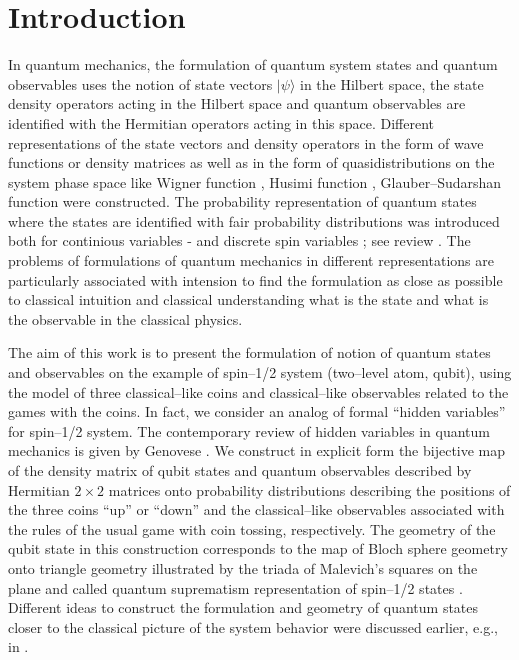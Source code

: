 \documentclass[12pt]{article}
\begin{document}
\section{Introduction}
In quantum mechanics, the formulation of quantum system states and quantum observables \cite{Dirac,Schrod,Landau,Neumann} uses the notion of state vectors $|\psi\rangle$ in the Hilbert space, the state density operators acting in the Hilbert space and quantum observables are identified with the Hermitian operators acting in this space. Different representations of the state vectors and density operators in the form of wave functions or density matrices as well as in the form of quasidistributions on the system phase space like Wigner function \cite{Wig32}, Husimi function \cite{Husimi40}, Glauber--Sudarshan function \cite{Glauber63,Sud563} were constructed. The probability representation of quantum states where the states are identified with fair probability distributions was introduced both for continious variables \cite{Mancini}-\cite{OVVILasRes} and discrete spin variables \cite{Dod,OlgaJETP,Bregence,Weigert1,Wiegert2,Painini}; see review \cite{MarmoPhysScr15t02015}. The problems of formulations of quantum mechanics in different representations are particularly associated with intension to find the formulation as close as possible to classical intuition and classical understanding what is the state and what is the observable in the classical physics.


The aim of this work is to present  the formulation of  notion of quantum states and observables on the example of spin--1/2 system (two--level atom, qubit), using the model of three classical--like coins and classical--like observables related to the games with the coins. In fact, we consider an analog of formal ``hidden variables'' for spin--1/2 system. The contemporary review of hidden variables in quantum mechanics is  given by Genovese \cite{Genovese}. We construct in explicit form the bijective map of the density matrix of qubit states and quantum observables described by Hermitian $2\times2$ matrices onto probability distributions describing the positions of the three coins ``up'' or ``down'' and the classical--like observables associated with the rules of the usual game with coin tossing, respectively. The geometry of the qubit state in this construction corresponds to the map of Bloch sphere geometry \cite{ChuangNelson} onto triangle geometry illustrated by the triada of Malevich's squares on the plane  \cite{Chernega1,Chernega2,Chernega3} and called quantum suprematism representation of spin--1/2 states \cite{PhysScr2018,Entr2018,confScr2018,MAVI2018Turin}. Different ideas to construct the formulation and geometry of quantum states closer to the classical picture of the system behavior were discussed earlier, e.g., in \cite{Wooters,Mielnik}.
\end{document}
